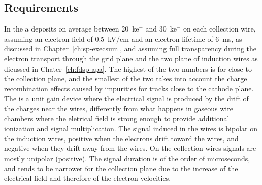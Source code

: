 \subsection{Requirements}
\label{sec:fdsp-tpcelec-overview-intro}


In the   a  deposits on average between
\SI{20}{k}{e$^-$} and \SI{30}{k}{e$^-$} on each collection wire, assuming an electron field
of \SI{0.5}{kV/cm} and an electron lifetime of \SI{6}{ms}, as discussed in
Chapter~\ref{ch:sp-execsum}, and assuming full transparency during the 
electron transport through the grid plane and the two plane of induction
wires as dicussed in Chater~\ref{ch:fdsp-apa}. The highest of the two numbers 
is for  close to the collection plane, and the smallest of the two
takes into account the charge recombination effects caused by impurities for 
tracks close to the cathode plane. The    is 
a unit gain device where the electrical signal is produced by the drift of the
charges near the wires, differently from what happens in gaseous wire 
chambers where the eletrical field is strong enough to provide additional
ionization and signal multiplication. The signal induced in the 
 wires is bipolar on the induction wires, positive when the
electrons drift toward the wires, and negative when they drift away from
the wires. On the collection wires signals are mostly unipolar (positive).
The signal duration is of the order of microseconds, and tends to be narrower
for the collection plane due to the increase of the electrical field and
therefore of the electron velocities.

